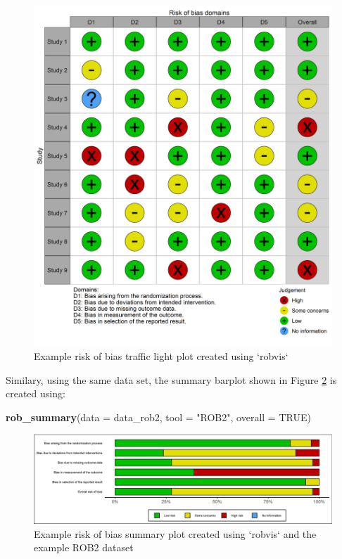 \documentclass[a4paper, nobind]{templates/ociamthesis}
\newenvironment{Shaded}{\begin{snugshade}}{\end{snugshade}}
\newcommand{\DataTypeTok}[1]{\textcolor[rgb]{0.13,0.29,0.53}{#1}}
\newcommand{\KeywordTok}[1]{\textcolor[rgb]{0.13,0.29,0.53}{\textbf{#1}}}
\newcommand{\NormalTok}[1]{#1}
\newcommand{\OtherTok}[1]{\textcolor[rgb]{0.56,0.35,0.01}{#1}}
\newcommand{\StringTok}[1]{\textcolor[rgb]{0.31,0.60,0.02}{#1}}
\renewenvironment{Shaded}
{
  \vspace{4pt}%
  \begin{snugshade}%
}{%
  \end{snugshade}%
  \vspace{4pt}%
}
\begin{document}
\begin{figure}
\includegraphics[width=1\linewidth,height=1\textheight]{figures/sys-rev-tools/example-rob-traffic-light-plot} \caption{Example risk of bias traffic light plot created using `robvis`}\label{fig:trafficplot}
\end{figure}

Similary, using the same data set, the summary barplot shown in Figure \ref{fig:summaryplot} is created using:

\begin{Shaded}
\begin{Highlighting}[]
\KeywordTok{rob_summary}\NormalTok{(}\DataTypeTok{data =}\NormalTok{ data_rob2,}
            \DataTypeTok{tool =} \StringTok{"ROB2"}\NormalTok{, }
            \DataTypeTok{overall =} \OtherTok{TRUE}\NormalTok{)}
\end{Highlighting}
\end{Shaded}

\begin{figure}
\includegraphics[width=1\linewidth,height=1\textheight]{figures/sys-rev-tools/example-rob-summary-barplot} \caption{Example risk of bias summary plot created using `robvis` and the example ROB2 dataset}\label{fig:summaryplot}
\end{figure}
\end{document}
